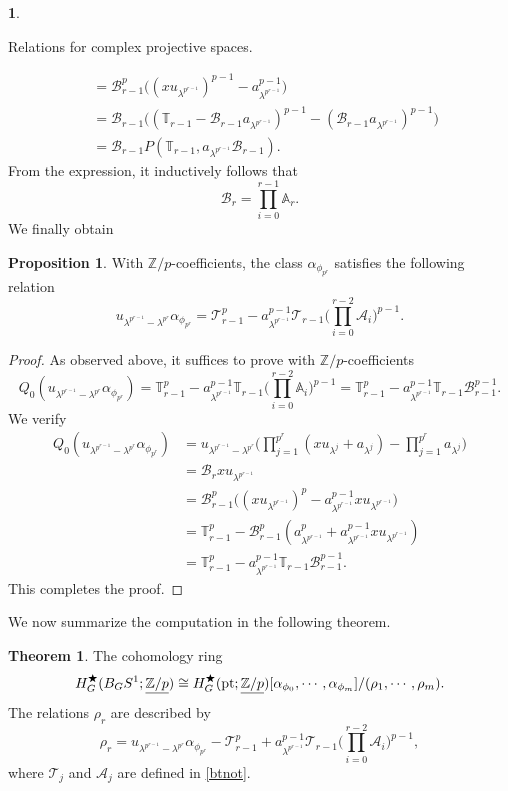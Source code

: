 \documentclass[a4paper,leqno,11pt]{amsart}
\theoremstyle{plain}
\theoremstyle{definition}
\newtheorem{prop}[theorem]{Proposition}
\newtheorem{subsec}[theorem]{}
\newtheorem{thm}[theorem]{Theorem}
\theoremstyle{remark}
\theoremstyle{definition}
\newcommand{\Z}{{\mathbb{Z}}}
\newcommand{\uZp}{\underline{\Z/p}}
\newcommand\A{{\mathbb A}}
\newcommand\BB{{\mathcal B}}
\newcommand\TT{{\mathcal T}}
\newcommand{\T}{{\mathbb T}}
\newenvironment{myeq}[1][]
{\stepcounter{theorem}\begin{equation}\tag{\thetheorem}{#1}}
	{\end{equation}}
\newenvironment{mysubsection}[2][]
{\begin{subsec}\begin{upshape}\begin{bfseries}{#2.}
			\end{bfseries}{#1}}
		{\end{upshape}\end{subsec}}
\newcommand{\cA}{\mathcal A}
\def\Z{\mathbb{Z}}
\def\a{\alpha}
\def\lam{\lambda}
\numberwithin{equation}{section}
\newcommand{\pt}{\textup{pt}}
\begin{document}
\begin{mysubsection}{Relations for complex projective spaces}
\[\begin{aligned}
	         &=\BB_{r-1}^p \big((xu_{\lambda^{p^{r-1}}})^{p-1}- a_{\lambda^{p^{r-1}}}^{p-1}\big)\\
	         &=\BB_{r-1}\big((\T_{r-1}- \BB_{r-1}a_{\lambda^{p^{r-1}}})^{p-1} - (\BB_{r-1}a_{\lambda^{p^{r-1}}})^{p-1}\big)\\
	         &= \BB_{r-1} P(\T_{r-1},a_{\lambda^{p^{r-1}}}\BB_{r-1}).  
	\end{aligned}\]
	From the expression, it inductively follows that 
	\begin{myeq}\label{Bexp}
	\BB_r= \prod_{i=0}^{r-1} \A_r.
	\end{myeq}
	We finally obtain
	\begin{prop}\label{r-reln} 
	With $\Z/p$-coefficients, the class $\a_{\phi_{p^{r}}}$ satisfies  the following relation
		\[
		u_{\lam^{p^{r-1}}-\lam^{p^{r}}}\a_{\phi_{p^{r}}}= \TT_{r-1}^p - a_{\lambda^{p^{r-1}}}^{p-1}\TT_{r-1}\big(\prod_{i=0}^{r-2} \cA_i\big)^{p-1}.
		\]
	\end{prop}
	   
	 \begin{proof}
	 As observed above, it suffices to prove with $\Z/p$-coefficients 
	 \[Q_0(u_{\lam^{p^{r-1}}-\lam^{p^{r}}}\a_{\phi_{p^{r}}})= \T_{r-1}^p - a_{\lambda^{p^{r-1}}}^{p-1}\T_{r-1}\big(\prod_{i=0}^{r-2} \A_i\big)^{p-1}= \T_{r-1}^p - a_{\lambda^{p^{r-1}}}^{p-1}\T_{r-1}\BB_{r-1}^{p-1}.\]
	We verify 
	 \[\begin{aligned}
	 Q_0(u_{\lam^{p^{r-1}}-\lam^{p^{r}}}\a_{\phi_{p^{r}}})&= u_{\lam^{p^{r-1}}-\lam^{p^{r}}} \big(\prod_{j=1}^{p^r}(xu_{\lambda^j}+a_{\lambda^j}) - \prod_{j=1}^{p^r} a_{\lambda^j} \big)\\
	 &= \BB_r x u_{\lambda^{p^{r-1}}} \\ 
	 &=\BB_{r-1}^p \big((xu_{\lambda^{p^{r-1}}})^p- a_{\lambda^{p^{r-1}}}^{p-1}x u_{\lambda^{p^{r-1}}}\big)\\
	 &=\T_{r-1}^p - \BB_{r-1}^p(a_{\lambda^{p^{r-1}}}^p + a_{\lambda^{p^{r-1}}}^{p-1}x u_{\lambda^{p^{r-1}}})\\
	 &=\T_{r-1}^p - a_{\lambda^{p^{r-1}}}^{p-1} \T_{r-1}\BB_{r-1}^{p-1}.
	 \end{aligned}\]
	 This completes the proof. 
	 \end{proof}  
	 
	 \smallskip 
	
	We now summarize the computation in the following theorem. 
	\begin{thm}\label{ringstrs1}
	The cohomology ring 
	\[ H^\bigstar_G (B_GS^1;\uZp) \cong H^\bigstar_G(\pt;\uZp)[\a_{\phi_0},\cdots,\a_{\phi_m}]/(\rho_1,\cdots, \rho_m).\]
	The relations $\rho_r$ are described by 
	\[\rho_r= u_{\lam^{p^{r-1}}-\lam^{p^{r}}}\a_{\phi_{p^{r}}}- \TT_{r-1}^p + a_{\lambda^{p^{r-1}}}^{p-1}\TT_{r-1}\big(\prod_{i=0}^{r-2} \cA_i\big)^{p-1}, \]
	where $\TT_j$ and $\cA_j$ are defined in \eqref{btnot}.
	\end{thm}
	\end{mysubsection}
\end{document}
